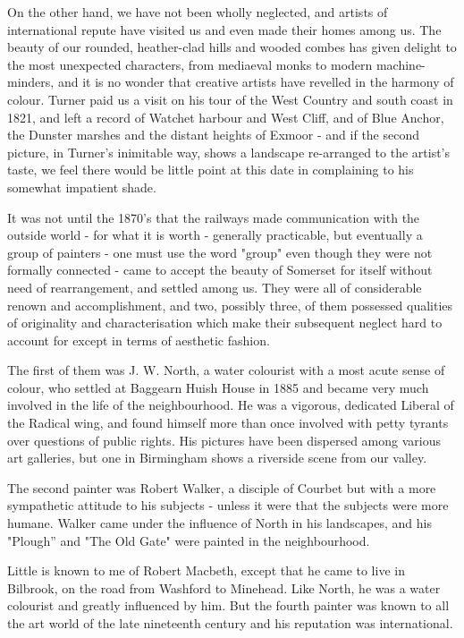 On the other hand, we have not been wholly neglected, and artists of international repute have visited us and even made their homes among us. The beauty of our rounded, heather-clad hills and wooded combes has given delight to the most unexpected characters, from mediaeval monks to modern machine-minders, and it is no wonder that creative artists have revelled in the harmony of colour. Turner paid us a visit on his tour of the West Country and south coast in 1821, and left a record of Watchet harbour and West Cliff, and of Blue Anchor, the Dunster marshes and the distant heights of Exmoor - and if the second picture, in Turner's inimitable way, shows a landscape re-arranged to the artist's taste, we feel there would be little point at this date in complaining to his somewhat impatient shade.

It was not until the 1870's that the railways made communication with the outside world - for what it is worth - generally practicable, but eventually a group of painters - one must use the word "group" even though they were not formally connected - came to accept the beauty of Somerset for itself without need of rearrangement, and settled among us. They were all of considerable renown and accomplishment, and two, possibly three, of them possessed qualities of originality and characterisation which make their subsequent neglect hard to account for except in terms of aesthetic fashion.

The first of them was J. W. North, a water colourist with a most acute sense of colour, who settled at Baggearn Huish House in 1885 and became very much involved in the life of the neighbourhood. He was a vigorous, dedicated Liberal of the Radical wing, and found himself more than once involved with petty tyrants over questions of public rights. His pictures have been dispersed among various art galleries, but one in Birmingham shows a riverside scene from our valley.

The second painter was Robert Walker, a disciple of Courbet but with a more sympathetic attitude to his subjects - unless it were that the subjects were more humane. Walker came under the influence of North in his landscapes, and his "Plough” and "The Old Gate" were painted in the neighbourhood.

Little is known to me of Robert Macbeth, except that he came to live in Bilbrook, on the road from Washford to Minehead. Like North, he was a water colourist and greatly influenced by him. But the fourth painter was known to all the art world of the late nineteenth century and his reputation was international.

